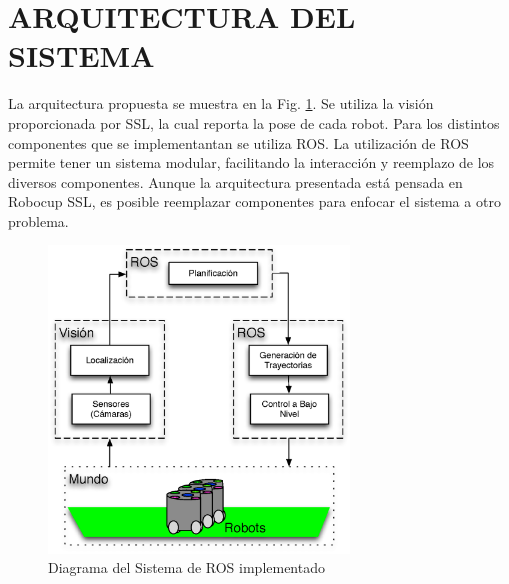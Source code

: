 \documentclass[twocolumn,10pt]{amrob}
\begin{document}
\section*{ARQUITECTURA DEL SISTEMA}

La arquitectura propuesta se muestra en la Fig. \ref{fig:ROSGral}. Se utiliza la visión proporcionada por SSL, la cual reporta la pose de cada robot. Para los distintos componentes que se implementantan se utiliza ROS. La utilización de ROS permite tener un sistema modular, facilitando la interacción y reemplazo de los diversos componentes. Aunque la arquitectura presentada está pensada en Robocup SSL, es posible reemplazar componentes para enfocar el sistema a otro problema. \par

\begin{figure}
  \centering
    \includegraphics[width=8cm]{arqGeneral.eps}
  \caption{Diagrama del Sistema de ROS implementado}
  \label{fig:ROSGral}
\end{figure}
\end{document}
